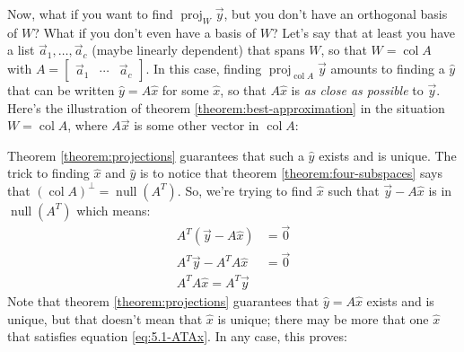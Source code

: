 \documentclass[11pt, letterpaper]{report}
\newenvironment{notes}{}{}
\newcounter{theorem}[chapter]
\DeclareMathOperator{\col}{col}
\DeclareMathOperator{\nul}{null}
\DeclareMathOperator{\proj}{proj}
\begin{document}
Now, what if you want to find $\proj_W\vec{y}$, but you don't have an orthogonal basis of $W$? What if you don't even have a basis of $W$? Let's say that at least you have a list $\vec{a}_1,\ldots,\vec{a}_c$ (maybe linearly dependent) that spans $W$, so that $W = \col A$ with $A = \begin{bmatrix}
\vec{a}_1 & \cdots & \vec{a}_c
\end{bmatrix}$. In this case, finding $\proj_{\col A}\vec{y}$ amounts to finding a $\hat{y}$ that can be written $\hat{y}=A\hat{x}$ for some $\hat{x}$, so that $A\hat{x}$ is \emph{as close as possible} to $\vec{y}$. Here's the illustration of theorem \ref{theorem:best-approximation} in the situation $W=\col A$, where $A\vec{x}$ is some other vector in $\col A$:

\begin{center}
\end{center}

\begin{notes}
\newpage
\end{notes}

Theorem \ref{theorem:projections} guarantees that such a $\hat{y}$ exists and is unique. The trick to finding $\hat{x}$ and $\hat{y}$ is to notice that theorem \ref{theorem:four-subspaces} says that $(\col A)^{\perp}=\nul (A^T)$. So, we're trying to find $\hat{x}$ such that $\vec{y}-A\hat{x}$ is in $\nul (A^T)$ which means:
\begin{align}\label{eq:5.1-ATAx}
A^T ( \vec{y}-A\hat{x} ) &= \vec{0} \nonumber\\
A^T\vec{y} - A^TA\hat{x} &= \vec{0} \nonumber\\
A^TA\hat{x}=A^T\vec{y}
\end{align}
Note that theorem \ref{theorem:projections} guarantees that $\hat{y}=A\hat{x}$ exists and is unique, but that doesn't mean that $\hat{x}$ is unique; there may be more that one $\hat{x}$ that satisfies equation \ref{eq:5.1-ATAx}. In any case, this proves:
\end{document}

